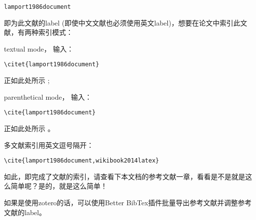 	\verb|lamport1986document| 
	
	即为此文献的label (即使中文文献也必须使用英文label)，想要在论文中索引此文献，有两种索引模式：\cite{lamport1986document}
	
	textual mode， 输入：
	
	\verb|\citet{lamport1986document}|
	
	正如此处所示 \cite{lamport1986document}; 
	
	parenthetical mode， 输入：
	
	\verb|\cite{lamport1986document}|
	
	正如此处所示 \cite{lamport1986document}。
	
	多文献索引用英文逗号隔开：
	
	\verb|\cite{lamport1986document,wikibook2014latex}|
	
	如此，即完成了文献的索引，请查看下本文档的参考文献一章，看看是不是就是这么简单呢？是的，就是这么简单\cite{wikibook2014latex}！
	
	如果是使用zotero的话，可以使用Better BibTex插件批量导出参考文献并调整参考文献的label。

	
